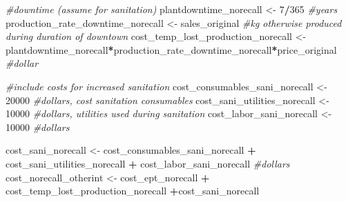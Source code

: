 \documentclass[
]{article}
\newenvironment{Shaded}{\begin{snugshade}}{\end{snugshade}}
\newcommand{\CommentTok}[1]{\textcolor[rgb]{0.56,0.35,0.01}{\textit{#1}}}
\newcommand{\DecValTok}[1]{\textcolor[rgb]{0.00,0.00,0.81}{#1}}
\newcommand{\NormalTok}[1]{#1}
\newcommand{\OtherTok}[1]{\textcolor[rgb]{0.56,0.35,0.01}{#1}}
\newcommand{\SpecialCharTok}[1]{\textcolor[rgb]{0.81,0.36,0.00}{\textbf{#1}}}
\begin{document}
\begin{Shaded}
\begin{Highlighting}[]
\CommentTok{\#downtime (assume for sanitation)}
\NormalTok{plantdowntime\_norecall }\OtherTok{\textless{}{-}} \DecValTok{7}\SpecialCharTok{/}\DecValTok{365} \CommentTok{\#years}
\NormalTok{production\_rate\_downtime\_norecall }\OtherTok{\textless{}{-}}\NormalTok{  sales\_original }\CommentTok{\#kg otherwise produced during duration of downtown}
\NormalTok{cost\_temp\_lost\_production\_norecall }\OtherTok{\textless{}{-}}\NormalTok{ plantdowntime\_norecall}\SpecialCharTok{*}\NormalTok{production\_rate\_downtime\_norecall}\SpecialCharTok{*}\NormalTok{price\_original }\CommentTok{\#dollar}

\CommentTok{\#include costs for increased sanitation}
\NormalTok{cost\_consumables\_sani\_norecall }\OtherTok{\textless{}{-}} \DecValTok{20000} \CommentTok{\#dollars, cost sanitation consumables}
\NormalTok{cost\_sani\_utilities\_norecall }\OtherTok{\textless{}{-}} \DecValTok{10000} \CommentTok{\#dollars, utilities used during sanitation}
\NormalTok{cost\_labor\_sani\_norecall }\OtherTok{\textless{}{-}} \DecValTok{10000} \CommentTok{\#dollars}


\NormalTok{cost\_sani\_norecall }\OtherTok{\textless{}{-}}\NormalTok{ cost\_consumables\_sani\_norecall }\SpecialCharTok{+}\NormalTok{ cost\_sani\_utilities\_norecall }\SpecialCharTok{+}\NormalTok{ cost\_labor\_sani\_norecall }\CommentTok{\#dollars}
\NormalTok{cost\_norecall\_otherint }\OtherTok{\textless{}{-}}\NormalTok{ cost\_ept\_norecall }\SpecialCharTok{+}\NormalTok{ cost\_temp\_lost\_production\_norecall }\SpecialCharTok{+}\NormalTok{cost\_sani\_norecall}
\end{Highlighting}
\end{Shaded}
\end{document}
